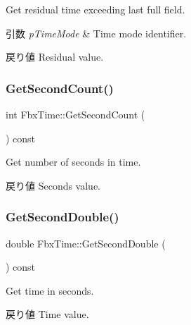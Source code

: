 Get residual time exceeding last full field. 
\begin{DoxyParams}{引数}
{\em p\+Time\+Mode} & Time mode identifier. \\
\hline
\end{DoxyParams}
\begin{DoxyReturn}{戻り値}
Residual value. 
\end{DoxyReturn}
\mbox{\label{class_fbx_time_abccce651a65f2c4232cc238f35c3a5d4}} 
\subsubsection{\texorpdfstring{Get\+Second\+Count()}{GetSecondCount()}}
{\footnotesize\ttfamily int Fbx\+Time\+::\+Get\+Second\+Count (\begin{DoxyParamCaption}{ }\end{DoxyParamCaption}) const}

Get number of seconds in time. \begin{DoxyReturn}{戻り値}
Seconds value. 
\end{DoxyReturn}
\mbox{\label{class_fbx_time_a11db10305535e388b8b2afb1b2bb89e6}} 
\subsubsection{\texorpdfstring{Get\+Second\+Double()}{GetSecondDouble()}}
{\footnotesize\ttfamily double Fbx\+Time\+::\+Get\+Second\+Double (\begin{DoxyParamCaption}{ }\end{DoxyParamCaption}) const}

Get time in seconds. \begin{DoxyReturn}{戻り値}
Time value. 
\end{DoxyReturn}
\mbox{\label{class_fbx_time_a3d36e985f2da20e855fa23906c97ed35}} 
